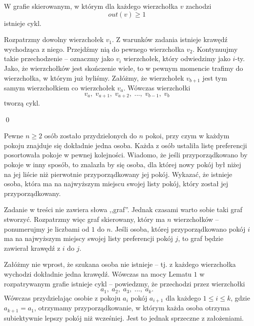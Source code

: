 \vspace{10px}


\noindent
W grafie skierowanym, w którym dla każdego wierzchołka $v$ zachodzi 
\[
	out(v) \geqslant 1
\] 
istnieje cykl.

\vspace{5px}


\noindent
Rozpatrzmy dowolny wierzchołek $v_1$. Z warunków zadania istnieje krawędź wychodząca z niego. Przejdźmy nią do pewnego wierzchołka $v_2$. Kontynuujmy takie przechodzenie -- oznaczmy jako $v_i$ wierzchołek, który odwiedzimy jako $i$-ty. Jako, że wierzchołków jest skończenie wiele, to w pewnym momencie trafimy do wierzchołka, w którym już byliśmy. Załóżmy, że wierzchołek $v_{b + 1}$ jest tym samym wierzchołkiem co wierzchołek $v_a$. Wówczas wierzchołki
\[
	v_a, \; v_{a + 1}, \; v_{a + 2}, \; ..., \; v_{b - 1}, \; v_b
\]
tworzą cykl.

\qed

\newpage



\noindent
Pewne $n \geqslant 2$ osób zostało przydzielonych do $n$ pokoi, przy czym w każdym pokoju znajduje się dokładnie jedna osoba. Każda z osób ustaliła listę preferencji posortowała pokoje w pewnej kolejności. Wiadomo, że jeśli przyporządkowano by pokoje w inny sposób, to znalazła by się osoba, dla której nowy pokój był niżej na jej liście niż pierwotnie przyporządkowany jej pokój. Wykazać, że istnieje osoba, która ma na najwyższym miejscu swojej listy pokój, który został jej przyporządkowany.

\vspace{5px}


\noindent
Zadanie w treści nie zawiera słowa ,,graf''. Jednak czasami warto sobie taki graf stworzyć. Rozpatrzmy więc graf skierowany, który ma $n$ wierzchołków -- ponumerujmy je liczbami od $1$ do $n$. Jeśli osoba, której przyporządkowano pokój $i$ ma na najwyższym miejscy swojej listy preferencji pokój $j$, to graf będzie zawierał krawędź z $i$ do $j$. 

\vspace{5px}

\noindent
Załóżmy nie wprost, że szukana osoba nie istnieje -- tj. z każdego wierzchołka wychodzi dokładnie jedna krawędź. Wówczas na mocy Lematu $1$ w rozpatrywanym grafie istnieje cykl -- powiedzmy, że przechodzi przez wierzchołki
\[
	a_1, \; a_2, \; a_3, \; ..., \; a_k.
\]
Wówczas przydzielając osobie z pokoju $a_i$ pokój $a_{i + 1}$ dla każdego $1 \leqslant i \leqslant k$, gdzie $a_{k + 1} = a_1$, otrzymamy przyporządkowanie, w którym każda osoba otrzyma subiektywnie lepszy pokój niż wcześniej. Jest to jednak sprzeczne z założeniami.

